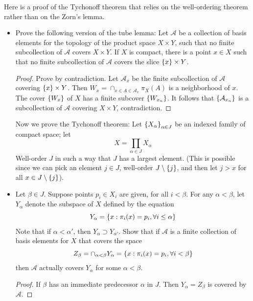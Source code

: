 \documentclass[12pt,a4paper]{article}
\begin{document}
    \begin{ex}
        Here is a proof of the Tychonoff theorem that relies on the well-ordering theorem rather than on the Zorn's lemma.
        \begin{itemize}
            \item Prove the following version of the tube lemma: Let $\mathcal{A}$ be a collection of basis elements for the topology of the product space $X\times Y$, such that no finite subcollection of $\mathcal{A}$ covers $X\times Y$. If $X$ is compact, there is a point $x\in X$ such that no finite subcollection of $\mathcal{A}$ covers the slice $\left\{x\right\}\times Y$.
            \begin{proof}
                Prove by contradiction. Let $\mathcal{A}_x$ be the finite subcollection of $\mathcal{A}$ covering $\left\{x\right\}\times Y$. Then $W_x=\cap_{x\in A\in\mathcal{A}_x}\pi_X(A)$ is a neighborhood of $x$. The cover $\left\{W_x\right\}$ of $X$ has a finite subcover $\left\{W_{x_n}\right\}$. It follows that $\left\{\mathcal{A}_{x_n}\right\}$ is a subcollection of $\mathcal{A}$ covering $X\times Y$, contradiction. 
            \end{proof}
            Now we prove the Tychonoff theorem: Let $\left\{X_\alpha\right\}_{\alpha\in J}$ be an indexed family of compact space; let
            $$
            X=\prod_{\alpha\in J}X_\alpha
            $$
            Well-order $J$ in such a way that $J$ has a largest element. (This is possible since we can pick an element $j\in J$, well-order $J\setminus\left\{j\right\}$, and then let $j>x$ for all $x\in J\setminus\left\{j\right\}$).
            
            \item Let $\beta\in J$. Suppose points $p_i\in X_i$ are given, for all $i<\beta$. For any $\alpha<\beta$, let $Y_\alpha$ denote the subspace of $X$ defined by the equation
            $$
            Y_\alpha=\left\{x:\pi_i(x)=p_i,\forall i\leq\alpha\right\}
            $$
            Note that if $\alpha<\alpha'$, then $Y_\alpha\supset Y_{\alpha'}$. Show that if $\mathcal{A}$ is a finite collection of basis elements for $X$ that covers the space
            $$
            Z_\beta=\cap_{\alpha<\beta}Y_\alpha=\left\{x:\pi_i(x)=p_i,\forall i<\beta\right\}
            $$
            then $\mathcal{A}$ actually covers $Y_\alpha$ for some $\alpha<\beta$.
            \begin{proof}
                If $\beta$ has an immediate predecessor $\alpha$ in $J$. Then $Y_\alpha=Z_\beta$ is covered by $\mathcal{A}$.
                

\end{proof}
\end{itemize}
\end{ex}
\end{document}
